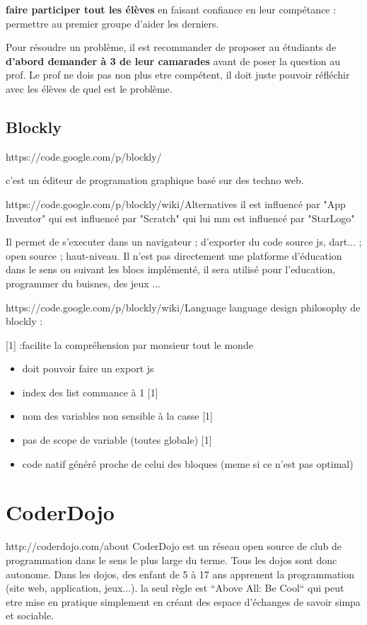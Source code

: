\textbf{faire participer tout les élèves} en faisant confiance en leur compétance : permettre au premier groupe d'aider les derniers.

Pour résoudre un problème, il est recommander de proposer au étudiants de \textbf{d'abord demander à 3 de leur camarades} avant de poser la question au prof. Le prof ne dois pas non plus etre compétent, il doit juste pouvoir réfléchir avec les élèves de quel est le problème.

\subsection{Blockly}
https://code.google.com/p/blockly/

c'est un éditeur de programation graphique basé sur des techno web. 

https://code.google.com/p/blockly/wiki/Alternatives
il est influencé par "App Inventor" qui est influencé par "Scratch" qui lui mm est influencé par "StarLogo"

Il permet de s'executer dans un navigateur ; d'exporter du code source js, dart... ; open source ; haut-niveau.
Il n'est pas directement une platforme d'éducation dans le sens ou suivant les blocs implémenté, il sera utilisé pour l'education, programmer du buisnes, des jeux ...

https://code.google.com/p/blockly/wiki/Language
language design philosophy de blockly :

[1] :facilite la compréhension par monsieur tout le monde
\begin{itemize}
  \item doit pouvoir faire un export js
  \item index des list commance à 1 [1]
  \item nom des variables non sensible à la casse [1]
  \item pas de scope de variable (toutes globale) [1]
  \item code natif généré proche de celui des bloques (meme si ce n'est pas optimal)
\end{itemize}

\section{CoderDojo}
http://coderdojo.com/about
CoderDojo est un réseau open source de club de programmation dans le sens le plus large du terme. Tous les dojos sont donc autonome.  Dans les dojos, des enfant de 5 à 17 ans apprenent la programmation (site web, application, jeux...). la seul règle est  “Above All: Be Cool“ qui peut etre mise en pratique simplement en créant des espace d'échanges de savoir simpa et sociable.

